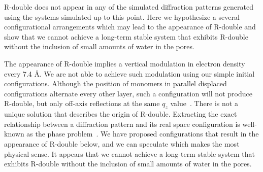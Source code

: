 \documentclass[journal=jpcbfk,manuscript=article]{achemso}
\begin{document}
  R-double does not appear in any of the simulated diffraction patterns
  generated using the systems simulated up to this point. Here we hypothesize a
  several configurational arrangements which may lead to the appearance of R-double and
  show that we cannot achieve a long-term stable system that exhibits R-double
  without the inclusion of small amounts of water in the pores.
  
  
  The appearance of R-double implies a vertical modulation in electron density
  every 7.4 \AA. We are not able to achieve such modulation using our simple
  initial configurations. Although the position of monomers in parallel displaced
  configurations alternate every other layer, such a configuration will not
  produce R-double, but only off-axis reflections at the same $q_z$
  value~\cite{harburn_atlas_1975}. There is not a unique solution that describes
  the origin of R-double. Extracting the exact relationship between a diffraction
  pattern and its real space configuration is well-known as the phase
  problem~\cite{taylor_phase_2003}. We have proposed configurations that
  result in the appearance of R-double below, and we can speculate which makes
  the most physical sense. It appears that we cannot achieve a long-term stable
  system that exhibits R-double without the inclusion of small amounts of water
  in the pores.
  
 
\end{document}
